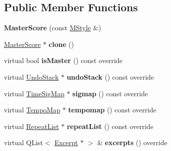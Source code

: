 \subsection*{Public Member Functions}
\begin{DoxyCompactItemize}
\item 
\mbox{\label{class_ms_1_1_master_score_aa04080e36a537bf92659173633f0f340}} 
{\bfseries Master\+Score} (const \hyperlink{class_ms_1_1_m_style}{M\+Style} \&)
\item 
\mbox{\label{class_ms_1_1_master_score_a74f40157e6063e974c9fd18897fb8bdd}} 
\hyperlink{class_ms_1_1_master_score}{Master\+Score} $\ast$ {\bfseries clone} ()
\item 
\mbox{\label{class_ms_1_1_master_score_abeb590f501c59433c8ed11774caf9dce}} 
virtual bool {\bfseries is\+Master} () const override
\item 
\mbox{\label{class_ms_1_1_master_score_abcdb47196b14ad5f99065317a65e88a8}} 
virtual \hyperlink{class_ms_1_1_undo_stack}{Undo\+Stack} $\ast$ {\bfseries undo\+Stack} () const override
\item 
\mbox{\label{class_ms_1_1_master_score_a50fdcb2b8607ddf6517a2b008b7bc609}} 
virtual \hyperlink{class_ms_1_1_time_sig_map}{Time\+Sig\+Map} $\ast$ {\bfseries sigmap} () const override
\item 
\mbox{\label{class_ms_1_1_master_score_a4b452620bc5f19ddff503a1deb1fe8b1}} 
virtual \hyperlink{class_ms_1_1_tempo_map}{Tempo\+Map} $\ast$ {\bfseries tempomap} () const override
\item 
\mbox{\label{class_ms_1_1_master_score_a857d4d724dfb7a6aa871aa29c8a39331}} 
virtual \hyperlink{class_ms_1_1_repeat_list}{Repeat\+List} $\ast$ {\bfseries repeat\+List} () const override
\item 
\mbox{\label{class_ms_1_1_master_score_a5e471a331aa2bee6d744e52960d8d14b}} 
virtual Q\+List$<$ \hyperlink{class_ms_1_1_excerpt}{Excerpt} $\ast$ $>$ \& {\bfseries excerpts} () override
\item 

\end{DoxyCompactItemize}
